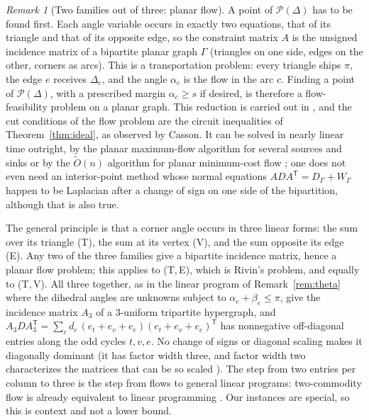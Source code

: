 \documentclass[11pt]{amsart}
\theoremstyle{definition}
\theoremstyle{remark}
\newtheorem{remark}[theorem]{Remark}
\newcommand{\Ot}{\widetilde{O}}
\begin{document}
\begin{remark}[Two families out of three: planar flow]\label{rem:lp}
A point of $\mathcal P(\Delta)$ has to be found first. Each angle variable occurs in exactly two equations, that of its triangle and that of its opposite edge, so the constraint matrix $A$ is the unsigned incidence matrix of a bipartite planar graph $\Gamma$
(triangles on one side, edges on the other, corners as arcs). This is a transportation problem: every triangle ships $\pi$, the edge $e$ receives $\Delta_e$, and the angle $\alpha_c$ is the flow in the arc $c$. Finding a point of $\mathcal P(\Delta)$, with a prescribed margin $\alpha_c\ge s$ if desired,
is therefore a flow-feasibility problem on a planar graph. This reduction is carried out in \cite{Riv03}, and the cut conditions of the flow problem are the circuit inequalities of Theorem~\ref{thm:ideal}, as observed by Casson. It can be solved in nearly linear time outright, by the planar maximum-flow algorithm for several sources and sinks \cite{BKMNW17} or by the $\Ot(n)$ algorithm for planar minimum-cost flow
\cite{DGGLPSY22}; one does not even need an interior-point method whose normal equations $ADA^{\mathsf T}=D_\Gamma+W_\Gamma$ happen to be Laplacian after a change of sign on one side of the bipartition, although that is also true.

The general principle is that a corner angle occurs in three linear forms: the sum over its triangle \textup{(T)}, the sum at its vertex \textup{(V)}, and the sum opposite its edge \textup{(E)}. Any two of the three families give a bipartite incidence matrix, hence a planar flow problem;
this applies to \textup{(T,\,E)}, which is Rivin's problem, and equally to \textup{(T,\,V)}. All three together, as in the linear program of Remark~\ref{rem:theta} where the dihedral angles are unknowns subject to $\alpha_e+\beta_e\le\pi$, give the incidence matrix $A_3$ of a $3$-uniform tripartite hypergraph, and
$A_3DA_3^{\mathsf T}=\sum_cd_c\,(e_{t}+e_{v}+e_{e})(e_{t}+e_{v}+e_{e})^{\mathsf T}$ has nonnegative off-diagonal entries along the odd cycles $t,v,e$. No change of signs or diagonal scaling makes it diagonally dominant (it has factor width three, and factor width two characterizes the matrices that can be so scaled \cite{BCPT05}).
The step from two entries per column to three is the step from flows to general linear programs: two-commodity flow is already equivalent to linear programming \cite{DKZ22}. Our instances are special, so this is context and not a lower bound.


\end{remark}
\end{document}
